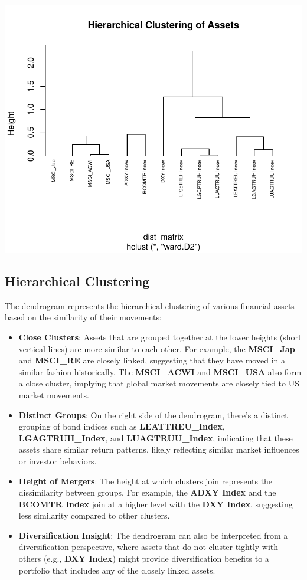 \documentclass[11pt,preprint, authoryear]{elsarticle}
\numberwithin{equation}{section}
\numberwithin{figure}{section}
\numberwithin{table}{section}
\begin{document}
\includegraphics{Question-6_files/figure-latex/dendro-1.pdf}

\hypertarget{hierarchical-clustering}{%
\subsection{Hierarchical Clustering}\label{hierarchical-clustering}}

The dendrogram represents the hierarchical clustering of various
financial assets based on the similarity of their movements:

\begin{itemize}
\item
  \textbf{Close Clusters}: Assets that are grouped together at the lower
  heights (short vertical lines) are more similar to each other. For
  example, the \textbf{MSCI\_Jap} and \textbf{MSCI\_RE} are closely
  linked, suggesting that they have moved in a similar fashion
  historically. The \textbf{MSCI\_ACWI} and \textbf{MSCI\_USA} also form
  a close cluster, implying that global market movements are closely
  tied to US market movements.
\item
  \textbf{Distinct Groups}: On the right side of the dendrogram, there's
  a distinct grouping of bond indices such as \textbf{LEATTREU\_Index},
  \textbf{LGAGTRUH\_Index}, and \textbf{LUAGTRUU\_Index}, indicating
  that these assets share similar return patterns, likely reflecting
  similar market influences or investor behaviors.
\item
  \textbf{Height of Mergers}: The height at which clusters join
  represents the dissimilarity between groups. For example, the
  \textbf{ADXY Index} and the \textbf{BCOMTR Index} join at a higher
  level with the \textbf{DXY Index}, suggesting less similarity compared
  to other clusters.
\item
  \textbf{Diversification Insight}: The dendrogram can also be
  interpreted from a diversification perspective, where assets that do
  not cluster tightly with others (e.g., \textbf{DXY Index}) might
  provide diversification benefits to a portfolio that includes any of
  the closely linked assets.
\end{itemize}
\end{document}
